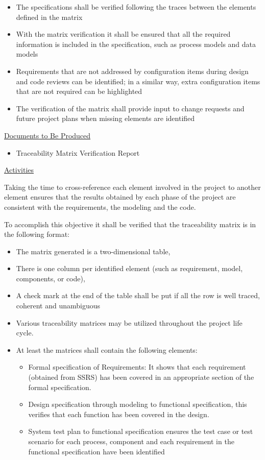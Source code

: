 \documentclass{template/openetcs_report}
\begin{document}
\begin{itemize}
\item The specifications shall be verified following the traces between the elements defined in the matrix
\item With the matrix verification it shall be ensured that all the required information is included in the specification, such as process models and data models
\item Requirements that are not addressed by configuration items during design and code reviews can be identified; in a similar way, extra configuration items that are not required can be highlighted
\item The verification of the matrix shall provide input to change requests and future project plans when missing elements are identified
\end{itemize}

\underline{Documents to Be Produced} 

\begin{itemize}
\item Traceability Matrix Verification Report
\end{itemize}

\underline{Activities}

Taking the time to cross-reference each element involved in the project to another element ensures that the results obtained by each phase of the project are consistent with the requirements, the modeling and the code. 

To accomplish this objective it shall be verified that the traceability matrix is in the following format:

\begin{itemize}

\item The matrix generated is a two-dimensional table,
\item There is one column per identified element (such as requirement, model, components, or code),
\item A check mark at the end of the table shall be put if all the row is well traced, coherent and unambiguous
\item Various traceability matrices may be utilized throughout the project life cycle.  \item At least the matrices shall contain the following elements:
\begin{itemize}
\item Formal specification of Requirements: It shows that each requirement (obtained from SSRS) has been covered in an appropriate section of the formal specification.
\item Design specification through modeling to functional specification, this verifies that each function has been covered in the design.
\item System test plan to functional specification ensures the test case or test scenario for each process, component and each requirement in the functional specification have been identified
\end{itemize}
\end{itemize}
\end{document}

